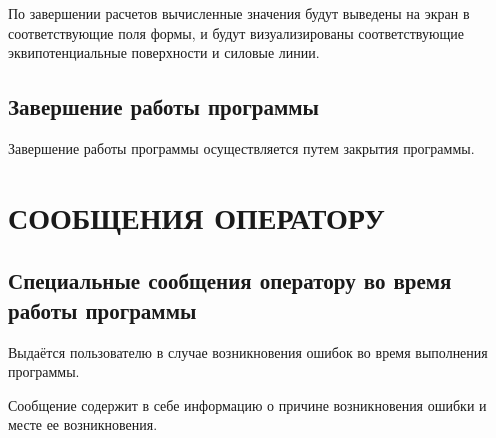 \documentclass[14pt,a4paper,final]{extreport}
\begin{document}
По завершении расчетов вычисленные значения будут выведены на экран в соответствующие поля формы, и будут визуализированы соответствующие эквипотенциальные поверхности и силовые линии.


\section{ Завершение работы программы}
Завершение работы программы осуществляется путем закрытия программы.


\chapter{СООБЩЕНИЯ ОПЕРАТОРУ}
\section{Специальные сообщения оператору во время работы программы}
Выдаётся пользователю в случае возникновения ошибок во время выполнения программы. 

Сообщение содержит в себе информацию о причине возникновения ошибки и месте ее возникновения.

\pagebreak

\label{lastpage}

\end{document}
